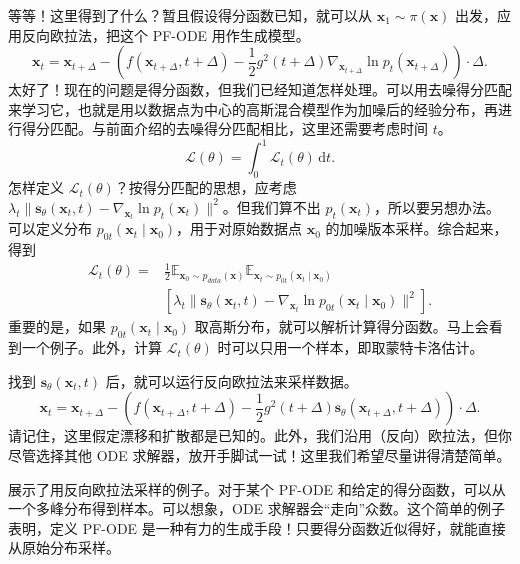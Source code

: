 等等！这里得到了什么？暂且假设得分函数已知，就可以从 $\mathbf x_1\sim\pi(\mathbf x)$ 出发，应用反向欧拉法，把这个 PF-ODE 用作生成模型。
\begin{equation}
  \mathbf x_t=\mathbf x_{t+\Delta}-
  \left(f(\mathbf x_{t+\Delta},t+\Delta)-
    \frac12g^2(t+\Delta)\nabla_{\mathbf x_{t+\Delta}}\ln p_t(\mathbf x_{t+\Delta})\right)\cdot\Delta.
  \tag{9.27}\label{eq:09-27}
\end{equation}
太好了！现在的问题是得分函数，但我们已经知道怎样处理。可以用去噪得分匹配来学习它，也就是用以数据点为中心的高斯混合模型作为加噪后的经验分布，再进行得分匹配。与前面介绍的去噪得分匹配相比，这里还需要考虑时间 $t$。
\begin{equation}
  \mathcal L(\theta)=\int_0^1\mathcal L_t(\theta)\,\mathrm dt.
  \tag{9.28}\label{eq:09-28}
\end{equation}
怎样定义 $\mathcal L_t(\theta)$？按得分匹配的思想，应考虑 $\lambda_t\lVert\mathbf s_\theta(\mathbf x_t,t)-\nabla_{\mathbf x_t}\ln p_t(\mathbf x_t)\rVert^2$。但我们算不出 $p_t(\mathbf x_t)$，所以要另想办法。可以定义分布 $p_{0t}(\mathbf x_t\mid\mathbf x_0)$，用于对原始数据点 $\mathbf x_0$ 的加噪版本采样。综合起来，得到
\begin{equation}
  \begin{aligned}
    \mathcal L_t(\theta)={}&\tfrac12\mathbb E_{\mathbf x_0\sim p_{\mathit{data}}(\mathbf x)}
      \mathbb E_{\mathbf x_t\sim p_{0t}(\mathbf x_t\mid\mathbf x_0)}\\
    &\left[\lambda_t\lVert\mathbf s_\theta(\mathbf x_t,t)
      -\nabla_{\mathbf x_t}\ln p_{0t}(\mathbf x_t\mid\mathbf x_0)\rVert^2\right].
  \end{aligned}
  \tag{9.29}\label{eq:09-29}
\end{equation}
重要的是，如果 $p_{0t}(\mathbf x_t\mid\mathbf x_0)$ 取高斯分布，就可以解析计算得分函数。马上会看到一个例子。此外，计算 $\mathcal L_t(\theta)$ 时可以只用一个样本，即取蒙特卡洛估计。

找到 $\mathbf s_\theta(\mathbf x_t,t)$ 后，就可以运行反向欧拉法来采样数据。
\begin{equation}
  \mathbf x_t=\mathbf x_{t+\Delta}-
  \left(f(\mathbf x_{t+\Delta},t+\Delta)-
    \frac12g^2(t+\Delta)\mathbf s_\theta(\mathbf x_{t+\Delta},t+\Delta)\right)\cdot\Delta.
  \tag{9.30}\label{eq:09-30}
\end{equation}
请记住，这里假定漂移和扩散都是已知的。此外，我们沿用（反向）欧拉法，但你尽管选择其他 ODE 求解器，放开手脚试一试！这里我们希望尽量讲得清楚简单。

 展示了用反向欧拉法采样的例子。对于某个 PF-ODE 和给定的得分函数，可以从一个多峰分布得到样本。可以想象，ODE 求解器会“走向”众数。这个简单的例子表明，定义 PF-ODE 是一种有力的生成手段！只要得分函数近似得好，就能直接从原始分布采样。

